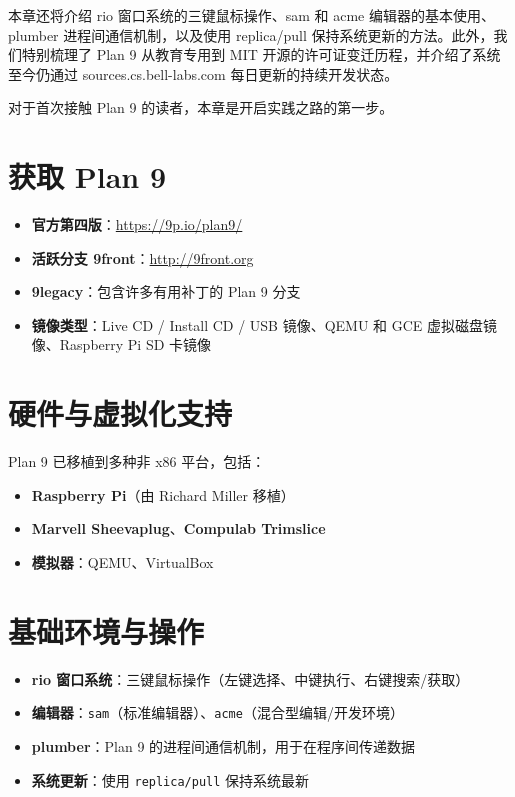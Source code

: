 \documentclass[12pt,UTF8]{ctexbook}
\begin{document}
本章还将介绍 rio 窗口系统的三键鼠标操作、sam 和 acme 编辑器的基本使用、plumber 进程间通信机制，以及使用 replica/pull 保持系统更新的方法。此外，我们特别梳理了 Plan 9 从教育专用到 MIT 开源的许可证变迁历程，并介绍了系统至今仍通过 sources.cs.bell-labs.com 每日更新的持续开发状态。

对于首次接触 Plan 9 的读者，本章是开启实践之路的第一步。
	
\section{获取 Plan 9}

\begin{itemize}
\item \textbf{官方第四版}：\url{https://9p.io/plan9/}
\item \textbf{活跃分支 9front}：\url{http://9front.org}
\item \textbf{9legacy}：包含许多有用补丁的 Plan 9 分支
\item \textbf{镜像类型}：Live CD / Install CD / USB 镜像、QEMU 和 GCE 虚拟磁盘镜像、Raspberry Pi SD 卡镜像
\end{itemize}
	
\section{硬件与虚拟化支持}

Plan 9 已移植到多种非 x86 平台，包括：

\begin{itemize}
\item \textbf{Raspberry Pi}（由 Richard Miller 移植）
\item \textbf{Marvell Sheevaplug}、\textbf{Compulab Trimslice}
\item \textbf{模拟器}：QEMU、VirtualBox
\end{itemize}
	
\section{基础环境与操作}

\begin{itemize}
\item \textbf{rio 窗口系统}：三键鼠标操作（左键选择、中键执行、右键搜索/获取）
\item \textbf{编辑器}：\texttt{sam}（标准编辑器）、\texttt{acme}（混合型编辑/开发环境）
\item \textbf{plumber}：Plan 9 的进程间通信机制，用于在程序间传递数据
\item \textbf{系统更新}：使用 \texttt{replica/pull} 保持系统最新
\end{itemize}
\end{document}

